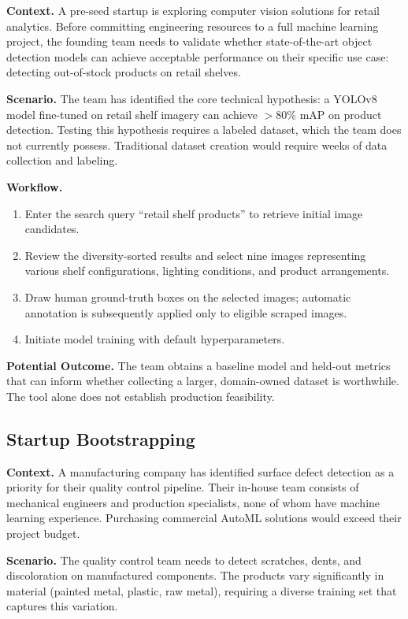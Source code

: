 \documentclass[12pt, letterpaper]{article}
\begin{document}
\textbf{Context.} A pre-seed startup is exploring computer vision solutions for retail
analytics. Before committing engineering resources to a full machine learning project,
the founding team needs to validate whether state-of-the-art object detection models can
achieve acceptable performance on their specific use case: detecting out-of-stock products
on retail shelves.

\textbf{Scenario.} The team has identified the core technical hypothesis: a YOLOv8 model
fine-tuned on retail shelf imagery can achieve $>$80\% mAP on product detection. Testing
this hypothesis requires a labeled dataset, which the team does not currently possess.
Traditional dataset creation would require weeks of data collection and labeling.

\textbf{Workflow.}
\begin{enumerate}
  \item Enter the search query ``retail shelf products'' to retrieve initial image candidates.
  \item Review the diversity-sorted results and select nine images representing various
    shelf configurations, lighting conditions, and product arrangements.
  \item Draw human ground-truth boxes on the selected images; automatic annotation is
    subsequently applied only to eligible scraped images.
  \item Initiate model training with default hyperparameters.
\end{enumerate}

\textbf{Potential Outcome.} The team obtains a baseline model and held-out metrics that can
inform whether collecting a larger, domain-owned dataset is worthwhile. The tool alone does
not establish production feasibility.

\subsection{Startup Bootstrapping}

\textbf{Context.} A manufacturing company has identified surface defect detection as a
priority for their quality control pipeline. Their in-house team consists of mechanical
engineers and production specialists, none of whom have machine learning experience.
Purchasing commercial AutoML solutions would exceed their project budget.

\textbf{Scenario.} The quality control team needs to detect scratches, dents, and
discoloration on manufactured components. The products vary significantly in material
(painted metal, plastic, raw metal), requiring a diverse training set that captures this
variation.
\end{document}
